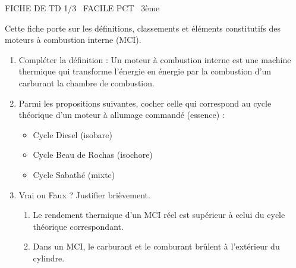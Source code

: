 \documentclass[11pt]{article}
\begin{document}
\begin{tcolorbox}[enhanced,colback=popink,colframe=popink,arc=10pt,boxrule=0pt,left=12pt,right=12pt,top=9pt,bottom=9pt]
{\color{white}\popxbold\small FICHE DE TD 1/3 \textbullet\ FACILE \hfill PCT \textbullet\ 3ème\par}
\end{tcolorbox}
\vspace{4pt}
Cette fiche porte sur les définitions, classements et éléments constitutifs des moteurs à combustion interne (MCI).

\begin{exercice}
\begin{enumerate}
    \item Compléter la définition : Un moteur à combustion interne est une machine thermique qui transforme l'énergie \underline{\hspace{4cm}} en énergie \underline{\hspace{4cm}} par la combustion d'un carburant \underline{\hspace{3cm}} la chambre de combustion.
    \item Parmi les propositions suivantes, cocher celle qui correspond au cycle théorique d'un moteur à allumage commandé (essence) : 
    \begin{itemize}
        \item Cycle Diesel (isobare)
        \item Cycle Beau de Rochas (isochore)
        \item Cycle Sabathé (mixte)
    \end{itemize}
    \item Vrai ou Faux ? Justifier brièvement.
    \begin{enumerate}
        \item Le rendement thermique d'un MCI réel est supérieur à celui du cycle théorique correspondant.
        \item Dans un MCI, le carburant et le comburant brûlent à l'extérieur du cylindre.
    \end{enumerate}
\end{enumerate}
\end{exercice}
\end{document}

